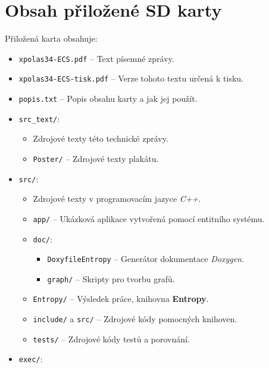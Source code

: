 
\chapter{Obsah přiložené SD karty}
\label{Att:Card}

Přiložená karta obsahuje:
\begin{itemize}
	\item \texttt{xpolas34-ECS.pdf} -- Text písemné zprávy.
	\item \texttt{xpolas34-ECS-tisk.pdf} -- Verze tohoto textu určená k tisku.
	\item \texttt{popis.txt} -- Popis obsahu karty a jak jej použít.
	\item \texttt{src\_text/}:
	\begin{itemize}
		\item Zdrojové texty této technické zprávy.
		\item \texttt{Poster/} -- Zdrojové texty plakátu.
	\end{itemize}
	\item \texttt{src/}:
	\begin{itemize}
		\item Zdrojové texty v programovacím jazyce \emph{C++}.
		\item \texttt{app/} -- Ukázková aplikace vytvořená pomocí entitního systému.
		\item \texttt{doc/}:
		\begin{itemize}
			\item \texttt{DoxyfileEntropy} -- Generátor dokumentace \emph{Doxygen}.
			\item \texttt{graph/} -- Skripty pro tvorbu grafů.
		\end{itemize}
		\item \texttt{Entropy/} -- Výsledek práce, knihovna \textbf{Entropy}.
		\item \texttt{include/} a \texttt{src/} -- Zdrojové kódy pomocných knihoven.
		\item \texttt{tests/} -- Zdrojové kódy testů a porovnání.
	\end{itemize}
	\item \texttt{exec/}:
	\begin{itemize}

\end{itemize}
\end{itemize}

